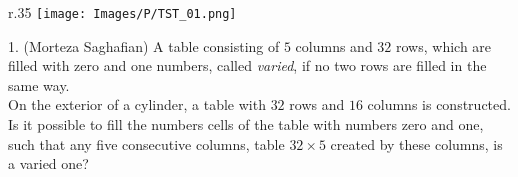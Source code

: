 \begin{wrapfigure}{r}{.35\textwidth}
		\vspace{-15pt}
		\centering
		\texttt{[image: Images/P/TST\_01.png]}
\end{wrapfigure}

	1. (Morteza Saghafian) A table consisting of $5$ columns and $32$ rows, which are filled with zero and one numbers, called \textit{varied}, if no two rows are filled in the same way.\\
	On the exterior of a cylinder, a table with $32$ rows and $16$ columns is constructed. Is it possible to fill the numbers cells of the table with numbers zero and one, such that any five consecutive columns, table $32\times5$ created by these columns, is a varied one?